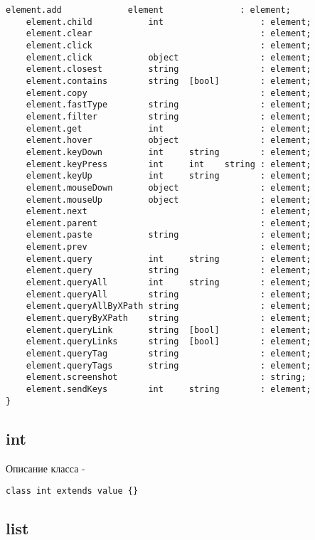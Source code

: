 \begin{lstlisting}[numbers=none]
    element.add             element               : element;
    element.child           int                   : element;
    element.clear                                 : element;
    element.click                                 : element;
    element.click           object                : element;
    element.closest         string 	              : element;
    element.contains        string 	[bool]        : element;
    element.copy                                  : element;
    element.fastType        string                : element;
    element.filter          string                : element;
    element.get             int                   : element;
    element.hover           object                : element;
    element.keyDown         int     string        : element;
    element.keyPress        int     int    string : element;
    element.keyUp           int     string        : element;
    element.mouseDown       object                : element;
    element.mouseUp         object                : element;
    element.next                                  : element;
    element.parent                                : element;
    element.paste           string                : element;
    element.prev                                  : element;
    element.query           int     string        : element;
    element.query           string                : element;
    element.queryAll        int     string        : element;
    element.queryAll        string                : element;
    element.queryAllByXPath string 	              : element;
    element.queryByXPath    string 	              : element;
    element.queryLink       string 	[bool]        : element;
    element.queryLinks      string  [bool]        : element;
    element.queryTag        string                : element;
    element.queryTags       string                : element;
    element.screenshot                            : string;
    element.sendKeys        int     string        : element;
}
\end{lstlisting}

\subsection{{\color{lightblue} int}}

\noindent Описание класса \integer -
\begin{lstlisting}[numbers=none]
class int extends value {}
\end{lstlisting}

\subsection{{\color{lightblue} list}}

